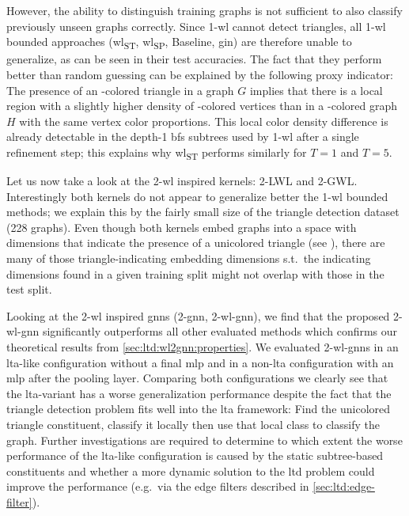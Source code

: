 However, the ability to distinguish training graphs is not sufficient to also classify previously unseen graphs correctly.
Since 1-\acs{wl} cannot detect triangles, all 1-\acs{wl} bounded approaches (\acs{wl}\textsubscript{ST}, \acs{wl}\textsubscript{SP}, Baseline, \acs{gin}) are therefore unable to generalize, as can be seen in their test accuracies.
The fact that they perform better than random guessing can be explained by the following proxy indicator:
The presence of an -colored triangle in a graph $G$ implies that there is a local region with a slightly higher density of -colored vertices than in a -colored graph $H$ with the same vertex color proportions.
This local color density difference is already detectable in the depth-1 \acs{bfs} subtrees used by 1-\acs{wl} after a single refinement step; this explains why \acs{wl}\textsubscript{ST} performs similarly for $T = 1$ and $T = 5$.

Let us now take a look at the 2-\acs{wl} inspired kernels: 2-LWL and 2-GWL.\@
Interestingly both kernels do not appear to generalize better the 1-\acs{wl} bounded methods;
we explain this by the fairly small size of the triangle detection dataset (228 graphs).
Even though both kernels embed graphs into a space with dimensions that indicate the presence of a unicolored triangle (see ), there are many of those triangle-indicating embedding dimensions s.t.\ the indicating dimensions found in a given training split might not overlap with those in the test split.

Looking at the 2-\acs{wl} inspired \acp{gnn} (2-\acs{gnn}, 2-\acs{wl}-\acs{gnn}), we find that the proposed 2-\acs{wl}-\acs{gnn} significantly outperforms all other evaluated methods which confirms our theoretical results from \cref{sec:ltd:wl2gnn:properties}.
We evaluated 2-\acs{wl}-\acsp{gnn} in an \acs{lta}-like configuration without a final \ac{mlp} and in a non-\acs{lta} configuration with an \ac{mlp} after the pooling layer.
Comparing both configurations we clearly see that the \acs{lta}-variant has a worse generalization performance despite the fact that the triangle detection problem fits well into the \ac{lta} framework:
Find the unicolored triangle constituent, classify it locally then use that local class to classify the graph.
Further investigations are required to determine to which extent the worse performance of the \acs{lta}-like configuration is caused by the static subtree-based constituents and whether a more dynamic solution to the \acf{ltd} problem could improve the performance (e.g.\ via the edge filters described in \cref{sec:ltd:edge-filter}).

